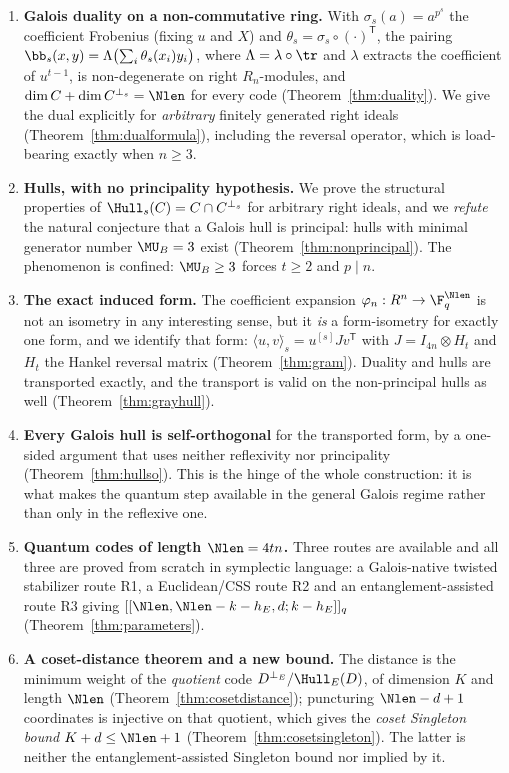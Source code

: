 \begin{enumerate}[label=\textnormal{(\arabic*)},leftmargin=*]
\item \textbf{Galois duality on a non-commutative ring.} With
  $\sigma_s(a)=a^{p^s}$ the coefficient Frobenius (fixing $u$ and $X$) and
  $\theta_s=\sigma_s\circ(\cdot)^{\mathsf T}$, the pairing
  $\bb_s(x,y)=\Lambda\bigl(\sum_i\theta_s(x_i)y_i\bigr)$, where
  $\Lambda=\lambda\circ\tr$ and $\lambda$ extracts the coefficient of
  $u^{t-1}$, is non-degenerate on right $R_n$-modules, and
  $\dim C+\dim C^{\perp_s}=\Nlen$ for every code (Theorem~\ref{thm:duality}).
  We give the dual explicitly for \emph{arbitrary} finitely generated right
  ideals (Theorem~\ref{thm:dualformula}), including the reversal operator,
  which is load-bearing exactly when $n\ge3$.

\item \textbf{Hulls, with no principality hypothesis.} We prove the structural
  properties of $\Hull_s(C)=C\cap C^{\perp_s}$ for arbitrary right ideals, and
  we \emph{refute} the natural conjecture that a Galois hull is principal: hulls
  with minimal generator number $\MU_B=3$ exist
  (Theorem~\ref{thm:nonprincipal}). The phenomenon is confined:
  $\MU_B\ge3$ forces $t\ge2$ and $p\mid n$.

\item \textbf{The exact induced form.} The coefficient expansion
  $\varphi_n:R^n\to\F_q^{\Nlen}$ is not an isometry in any interesting sense,
  but it \emph{is} a form-isometry for exactly one form, and we identify that
  form: $\langle u,v\rangle^{\widehat{}}_s=u^{[s]}Jv^{\mathsf T}$ with
  $J=I_{4n}\otimes H_t$ and $H_t$ the Hankel reversal matrix
  (Theorem~\ref{thm:gram}). Duality and hulls are transported exactly, and the
  transport is valid on the non-principal hulls as well
  (Theorem~\ref{thm:grayhull}).

\item \textbf{Every Galois hull is self-orthogonal} for the transported form,
  by a one-sided argument that uses neither reflexivity nor principality
  (Theorem~\ref{thm:hullso}). This is the hinge of the whole construction: it
  is what makes the quantum step available in the general Galois regime rather
  than only in the reflexive one.

\item \textbf{Quantum codes of length $\Nlen=4tn$.} Three routes are available
  and all three are proved from scratch in symplectic language: a Galois-native
  twisted stabilizer route R1, a Euclidean/CSS route R2 and an
  entanglement-assisted route R3 giving
  $[[\Nlen,\Nlen-k-h_E,d;k-h_E]]_q$ (Theorem~\ref{thm:parameters}).

\item \textbf{A coset-distance theorem and a new bound.} The distance is the
  minimum weight of the \emph{quotient} code
  $D^{\perp_E}/\Hull_E(D)$, of dimension $K$ and length $\Nlen$
  (Theorem~\ref{thm:cosetdistance}); puncturing $\Nlen-d+1$ coordinates is
  injective on that quotient, which gives the \emph{coset Singleton bound}
  $K+d\le \Nlen+1$ (Theorem~\ref{thm:cosetsingleton}). The latter is neither
  the entanglement-assisted Singleton bound nor implied by it.
\end{enumerate}

